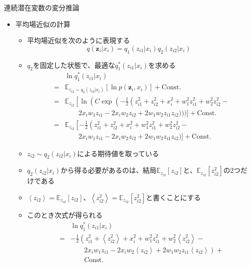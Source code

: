 \documentclass[dvipdfmx,notheorems,t]{beamer}
\begin{document}
\begin{frame}{連続潜在変数の変分推論}
\begin{itemize}
\begin{itemize}
		\item $z_{i1}$と$z_{i2}$を乗算する項が存在する
		\item 従って、真の事後分布は、\color{red}$z_{i1}$と$z_{i2}$のみの因子には分解できない\normalcolor ことが分かる
	\end{itemize} \
	
	\item 平均場近似の計算
	\begin{itemize}
		\item 平均場近似を次のように表現する
		\begin{equation}
			q(\bm{z}_i | x_i) = q_1(z_{i1} | x_i) q_2(z_{i2} | x_i)
		\end{equation}
		
		\item $q_2$を固定した状態で、最適な$q_1^*(z_{i1} | x_i)$を求める
		\begin{eqnarray}
			&& \ln q_1^*(z_{i1} | x_i) \nonumber \\
			&=& \mathbb{E}_{z_{i2} \sim q_2(z_{i2} | x_i)} \left[ \ln p(\bm{z}_i, x_i) \right] + \mathrm{Const.} \\
			&=& \mathbb{E}_{z_{i2}} \left[ \ln \left( C \exp \left( -\frac{1}{2} \left( z_{i1}^2 + z_{i2}^2 + x_i^2 + w_1^2 z_{i1}^2 + w_2^2 z_{i2}^2 - \right. \right. \right. \right. \nonumber \\
			&& \qquad 2 x_i w_1 z_{i1} - 2 x_i w_2 z_{i2} + 2 w_1 w_2 z_{i1} z_{i2} \big) \bigg) \bigg) \bigg] + \mathrm{Const.} \nonumber \\
			&=& \mathbb{E}_{z_{i2}} \left[ -\frac{1}{2} \left( z_{i1}^2 + z_{i2}^2 + x_i^2 + w_1^2 z_{i1}^2 + w_2^2 z_{i2}^2 - \right. \right. \nonumber \\
			&& \qquad 2 x_i w_1 z_{i1} - 2 x_i w_2 z_{i2} + 2 w_1 w_2 z_{i1} z_{i2} \big) \bigg] + \mathrm{Const.}
		\end{eqnarray}
		
		\item $z_{i2} \sim q_2(z_{i2} | x_i)$による期待値を取っている
		\item $q_2(z_{i2} | x_i)$から得る必要があるのは、結局$\mathbb{E}_{z_{i2}}[z_{i2}]$と、$\mathbb{E}_{z_{i2}}[z_{i2}^2]$の2つだけである
		\item $\left< z_{i2} \right> = \mathbb{E}_{z_{i2}}[z_{i2}]$、$\left< z_{i2}^2 \right> = \mathbb{E}_{z_{i2}}[z_{i2}^2]$と書くことにする
		\newline
		
		\item このとき次式が得られる
		\begin{eqnarray}
			&& \ln q_1^*(z_{i1} | x_i) \nonumber \\
			&=& -\frac{1}{2} \left( z_{i1}^2 + \left< z_{i2}^2 \right> + x_i^2 + w_1^2 z_{i1}^2 + w_2^2 \left< z_{i2}^2 \right> - \right. \nonumber \\
			&& \qquad \left. 2 x_i w_1 z_{i1} - 2 x_i w_2 \left< z_{i2} \right> + 2 w_1 w_2 z_{i1} \left< z_{i2} \right> \right) + \nonumber \\
			&& \qquad \mathrm{Const.}
		\end{eqnarray}
		

\end{itemize}
\end{itemize}
\end{frame}
\end{document}
